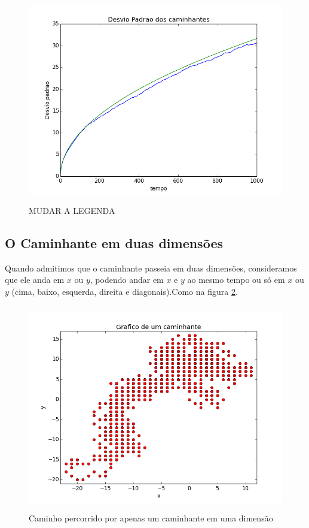 \documentclass[12pt,a4paper]{article}
\begin{document}
\begin{figure}[H]
\centering
\includegraphics[width=12cm,height=9cm]{imgs/1d/desvio.png}
\caption{MUDAR A LEGENDA}
\label{desvio1}
\end{figure}

\newpage
\subsection{O Caminhante em duas dimensões}
Quando admitimos que o caminhante passeia em duas dimensões, consideramos que ele anda em $x$ ou $y$, podendo andar em $x$ e $y$ ao mesmo tempo ou só em $x$ ou $y$ (cima, baixo, esquerda, direita e diagonais).Como na figura \ref{um_caminhante2}.

\begin{figure}[H]
\centering
\includegraphics[width=12cm,height=9cm]{imgs/2d/um_caminhante.png}
\caption{Caminho percorrido por apenas um caminhante em uma dimensão}
\label{um_caminhante2}
\end{figure}
\end{document}
